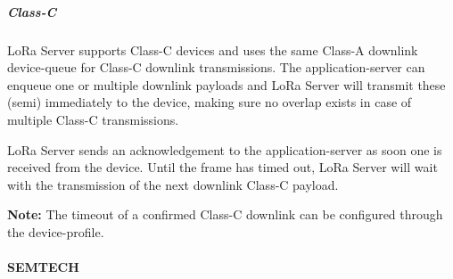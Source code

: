 
\subparagraph{Class-C}

LoRa Server supports Class-C devices and uses the same Class-A downlink device-queue for Class-C downlink transmissions.
The application-server can enqueue one or multiple downlink payloads and LoRa Server will transmit these (semi) immediately to the device,
	making sure no overlap exists in case of multiple Class-C transmissions.

LoRa Server sends an acknowledgement to the application-server as soon one is received from the device.
Until the frame has timed out,
	LoRa Server will wait with the transmission of the next downlink Class-C payload.

\textbf{Note:} The timeout of a confirmed Class-C downlink can be configured through the device-profile.




\paragraph{SEMTECH}



